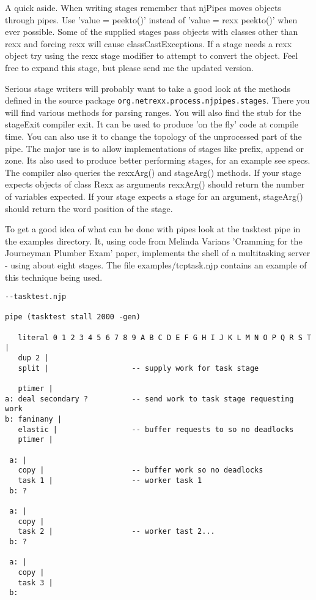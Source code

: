 A quick aside.  When writing stages remember that njPipes moves objects through pipes.  Use 'value = peekto()' instead of 'value = rexx peekto()' when ever possible.  Some of the supplied stages pass objects with classes other than rexx and forcing rexx will cause classCastExceptions. If a stage needs a rexx object try using the rexx stage modifier to attempt to convert the object.  Feel free to expand this stage, but please send me the updated version.

Serious stage writers will probably want to take a good look at the
methods defined in the \nr{} source package \texttt{org.netrexx.process.njpipes.stages}.  There you will find various methods for parsing ranges.  You will also find the stub for the stageExit compiler exit.  It can be used to produce 'on the fly' code at compile time.  You can also use it to change the topology of the unprocessed part of the pipe.  The major use is to allow implementations of stages like prefix, append or zone.  Its also used to produce better performing stages, for an example see specs.
The compiler also queries the rexxArg() and stageArg() methods.  If your stage expects objects of class Rexx as arguments rexxArg() should return the number of variables expected.  If your stage expects a stage for an argument, stageArg() should return the word position of the stage.

To get a good idea of what can be done with pipes look at the tasktest
pipe in the examples directory.  It, using code from Melinda Varians
'Cramming for the Journeyman Plumber Exam' paper,  implements the
shell of a  multitasking server - using about eight stages.  The file
examples/tcptask.njp contains an example of this technique being used.
\begin{lstlisting}
--tasktest.njp

pipe (tasktest stall 2000 -gen)

   literal 0 1 2 3 4 5 6 7 8 9 A B C D E F G H I J K L M N O P Q R S T |
   dup 2 |
   split |                   -- supply work for task stage

   ptimer |
a: deal secondary ?          -- send work to task stage requesting work
b: faninany |
   elastic |                 -- buffer requests to so no deadlocks
   ptimer |

 a: |
   copy |                    -- buffer work so no deadlocks
   task 1 |                  -- worker task 1
 b: ?

 a: |
   copy |
   task 2 |                  -- worker tast 2...
 b: ?

 a: |
   copy |
   task 3 |
 b:
\end{lstlisting}


